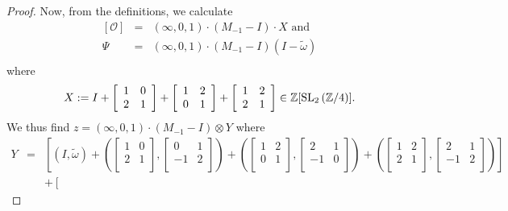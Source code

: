 \documentclass[12pt]{amsart}
\theoremstyle{definition}
\newcommand{\Z}{\Bbb{Z}}
\newcommand{\oct}{\mathcal{O}}%
\newcommand{\scyc}[1]{\left[ #1 \right]} %
\newcommand{\spl}[2]{\operatorname{SL}_{#1}\left(#2\right)}
\newcommand{\<}{\langle}
\renewcommand{\>}{\rangle}
\begin{document}
\begin{proof}
Now, from the definitions, we calculate
\begin{eqnarray*}
\scyc{\oct}&=&(\infty,0,1)\cdot (M_{-1}-I)\cdot X\mbox{ and }\\
\Psi&=&(\infty,0,1)\cdot (M_{-1}-I)(I-\tilde{\omega})\\
\end{eqnarray*}
where 
\[
X:=I+\left[
\begin{array}{cc}
1&0\\
2&1\\
\end{array}
\right]+\left[
\begin{array}{cc}
1&2\\
0&1\\
\end{array}
\right]+\left[
\begin{array}{cc}
1&2\\
2&1\\
\end{array}
\right]\in \Z[\spl{2}{\Z/4}].
\]
We thus find $z=(\infty,0,1)\cdot (M_{-1}-I)\otimes Y$ where 
\begin{eqnarray*}
Y&=&\left[ (I,\tilde{\omega})+\left(\left[
\begin{array}{cc}
1&0\\
2&1\\
\end{array}
\right],\left[
\begin{array}{cc}
0&1\\
-1&2\\
\end{array}
\right]\right)+
\left(\left[
\begin{array}{cc}
1&2\\
0&1\\
\end{array}
\right],\left[
\begin{array}{cc}
2&1\\
-1&0\\
\end{array}
\right]\right)
+\left(\left[
\begin{array}{cc}
1&2\\
2&1\\
\end{array}
\right],\left[
\begin{array}{cc}
2&1\\
-1&2\\
\end{array}
\right]\right)\right]\\
&&+\left[

\end{eqnarray*}
\end{proof}
\end{document}

